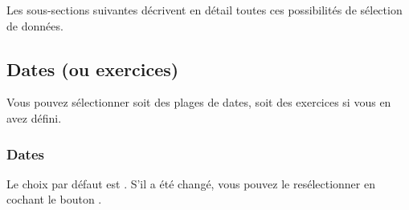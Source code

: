 Les sous-sections suivantes décrivent en détail toutes ces possibilités de sélection de données.


\subsection{Dates (ou exercices)\label{reportscreation-selection-dates}}

Vous pouvez sélectionner soit des plages de dates, soit des exercices si
vous en avez défini.


\subsubsection{Dates}

Le choix par défaut est . S'il a été changé, vous pouvez le resélectionner en cochant le bouton . 

